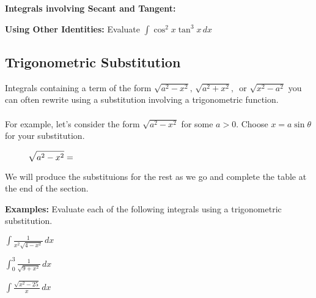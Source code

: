 \documentclass[addpoints, 12pt]{exam}
\begin{document}
\textbf{Integrals involving Secant and Tangent:}

\textbf{Using Other Identities:} Evaluate $\displaystyle\int \cos^2 x\tan^3 x\,dx$

\newpage
{}
\subsection*{Trigonometric Substitution}
Integrals containing a term of the form $\displaystyle\sqrt{a^2-x^2},\,\sqrt{a^2+x^2},\,$ or $\displaystyle\sqrt{x^2-a^2}$ you can often rewrite using a substitution involving a trigonometric function.\\
\\
For example, let's consider the form $\displaystyle\sqrt{a^2-x^2}$ for some $a>0$. Choose $x=a\sin\theta$ for your substitution.

\[\sqrt{a^2-x^2}=\hspace{3.5in}\]

We will produce the substituions for the rest as we go and complete the table at the end of the section.

\vspace{.5in}

\textbf{Examples:} Evaluate each of the following integrals using a trigonometric substitution.

\begin{questions}
    \question $\displaystyle\int\frac{1}{x^2\sqrt{4-x^2}}\,dx$
    
    \question $\displaystyle\int_0^3 \frac{1}{\sqrt{9+x^2}}\,dx$
    
    \newpage
    
    \question $\displaystyle\int\frac{\sqrt{x^2-25}}{x}\,dx$

    
\end{questions}
\end{document}
